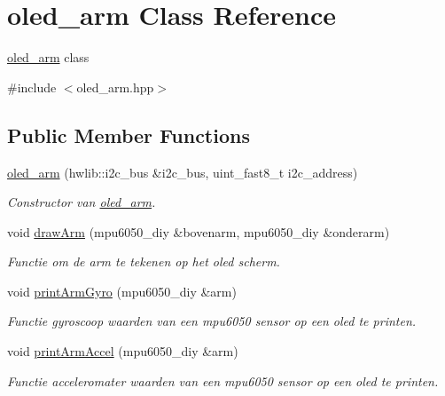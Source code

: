 \hypertarget{classoled__arm}{}\section{oled\+\_\+arm Class Reference}
\label{classoled__arm}


\hyperlink{classoled__arm}{oled\+\_\+arm} class  




{\ttfamily \#include $<$oled\+\_\+arm.\+hpp$>$}

\subsection*{Public Member Functions}
\begin{DoxyCompactItemize}
\item 
\hyperlink{classoled__arm_a0d1436ad9431a1778767beef0510c908}{oled\+\_\+arm} (hwlib\+::i2c\+\_\+bus \&i2c\+\_\+bus, uint\+\_\+fast8\+\_\+t i2c\+\_\+address)
\begin{DoxyCompactList}\small\item\em Constructor van \hyperlink{classoled__arm}{oled\+\_\+arm}. \end{DoxyCompactList}\item 
void \hyperlink{classoled__arm_a5d43e95edefb6f7fc363f4da8d1c3b1e}{draw\+Arm} (mpu6050\+\_\+diy \&bovenarm, mpu6050\+\_\+diy \&onderarm)
\begin{DoxyCompactList}\small\item\em Functie om de arm te tekenen op het oled scherm. \end{DoxyCompactList}\item 
void \hyperlink{classoled__arm_a35bcedc3e023c1744420fdc377ca980c}{print\+Arm\+Gyro} (mpu6050\+\_\+diy \&arm)
\begin{DoxyCompactList}\small\item\em Functie gyroscoop waarden van een mpu6050 sensor op een oled te printen. \end{DoxyCompactList}\item 
void \hyperlink{classoled__arm_ae5eecd55d90a5c6137bfc4cef0cbcb2f}{print\+Arm\+Accel} (mpu6050\+\_\+diy \&arm)
\begin{DoxyCompactList}\small\item\em Functie acceleromater waarden van een mpu6050 sensor op een oled te printen. \end{DoxyCompactList}\end{DoxyCompactItemize}


